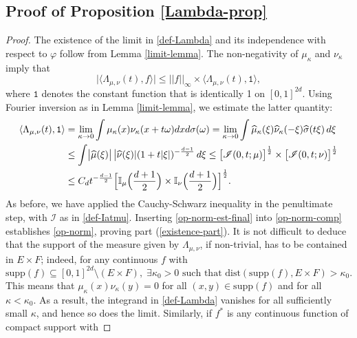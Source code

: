\documentclass[a4paper,11pt]{amsart}
\numberwithin{equation}{section}
\begin{document}
\subsection{Proof of Proposition \ref{Lambda-prop}} 
\begin{proof} 
 The existence of the limit in \eqref{def-Lambda} and its independence with respect to $\varphi$ follow from Lemma \ref{limit-lemma}.  The non-negativity of $\mu_{\kappa}$ and $\nu_{\kappa}$ imply that
\begin{equation}  \label{op-norm-comp} 
 \bigl| \langle \Lambda_{\mu, \nu}(t), f \rangle \bigr| \leq ||f||_{\infty} \times \langle \Lambda_{\mu, \nu}(t), \mathtt 1 \rangle,  \end{equation} 
where $\mathtt 1$ denotes the constant function that is identically 1 on $[0,1]^{2d}$. Using Fourier inversion as in Lemma \ref{limit-lemma}, we estimate the latter quantity:   
\begin{align}
\langle \Lambda_{\mu, \nu}(t), \mathtt 1 \rangle &= \lim_{\kappa \rightarrow 0}  \int \mu_{\kappa}(x) \nu_{\kappa}(x + t \omega) dx d\sigma(\omega) = \lim_{\kappa \rightarrow 0} \int \widehat{\mu}_{\kappa}(\xi) \widehat{\nu}_{\kappa}(-\xi) \widehat{\sigma}(t \xi) \, d\xi \nonumber \\ 
&\leq \int \bigl|\widehat{\mu}(\xi)\bigr| \, \bigl| \widehat{\nu}(\xi)| (1 + t|\xi|)^{-\frac{d-1}{2}} \, d\xi \leq \bigl[ \mathscr{I}(0, t;\mu) \bigr]^{\frac{1}{2}} \times \bigl[ \mathscr{I}(0, t;\nu) \bigr]^{\frac{1}{2}} \nonumber \\
&\leq C_d t^{-\frac{d-1}{2}} \Bigl[\mathbb I_{\mu}\Bigl(\frac{d+1}{2}\Bigr) \times \mathbb I_{\nu}\Bigl(\frac{d+1}{2} \Bigr)\Bigr]^{\frac{1}{2}}.  \label{op-norm-est-final}
\end{align}
As before, we have applied the Cauchy-Schwarz inequality in the penultimate step, with $\mathscr{I}$ as in \eqref{def-Iatmu}. Inserting \eqref{op-norm-est-final} into \eqref{op-norm-comp} establishes \eqref{op-norm}, proving part (\ref{existence-part}). 
\vskip0.1in
\noindent It is not difficult to deduce that the support of the measure given by $\Lambda_{\mu, \nu}$, if non-trivial, has to be contained in $E \times F$; indeed, for any continuous $f$ with 
\[ \text{supp}(f) \subseteq [0,1]^{2d} \setminus (E \times F),\; \exists \kappa_0 > 0 \text{ such that dist}(\text{supp}(f), E \times F) > \kappa_0. \] This means that $\mu_{\kappa}(x) \nu_{\kappa}(y) = 0$ for all $(x, y) \in \text{supp}(f)$ and for all $\kappa < \kappa_0$. As a result, the integrand in \eqref{def-Lambda} vanishes  for all sufficiently small $\kappa$, and hence so does the limit. Similarly, if $f^{\ast}$ is any continuous function of compact support with 

\end{proof}
\end{document}
